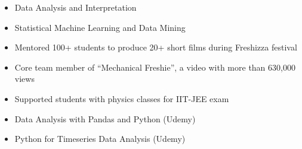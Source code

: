 \documentclass[10pt,a4paper,ragged2e,withhyper]{altacv}
\begin{document}
\begin{paracol}{2}
\begin{itemize}
\item Data Analysis and Interpretation
\item Statistical Machine Learning and Data Mining
\end{itemize}



\label{sec:orgc272286}

\begin{itemize}
\item Mentored 100+ students to produce 20+ short films during Freshizza festival
\item Core team member of ``Mechanical Freshie'', a video with more than 630,000 views
\item Supported students with physics classes for IIT-JEE exam
\end{itemize}

\label{sec:orgc622018}

\begin{itemize}
\item Data Analysis with Pandas and Python (Udemy)
\item Python for Timeseries Data Analysis (Udemy)
\end{itemize}

\end{paracol}
\end{document}

